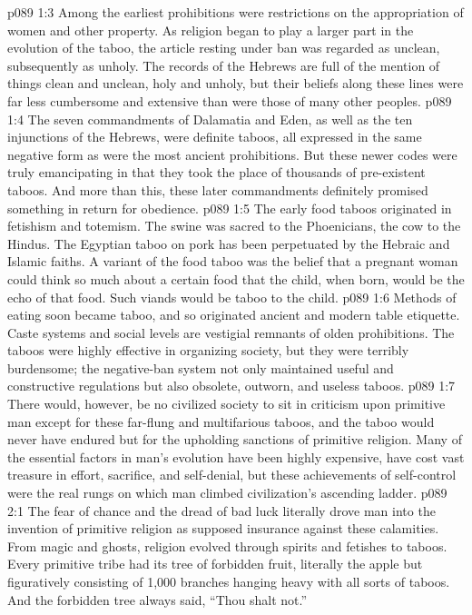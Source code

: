 \vs p089 1:3 Among the earliest prohibitions were restrictions on the appropriation of women and other property. As religion began to play a larger part in the evolution of the taboo, the article resting under ban was regarded as unclean, subsequently as unholy. The records of the Hebrews are full of the mention of things clean and unclean, holy and unholy, but their beliefs along these lines were far less cumbersome and extensive than were those of many other peoples.
\vs p089 1:4 The seven commandments of Dalamatia and Eden, as well as the ten injunctions of the Hebrews, were definite taboos, all expressed in the same negative form as were the most ancient prohibitions. But these newer codes were truly emancipating in that they took the place of thousands of pre\hyp{}existent taboos. And more than this, these later commandments definitely promised something in return for obedience.
\vs p089 1:5 The early food taboos originated in fetishism and totemism. The swine was sacred to the Phoenicians, the cow to the Hindus. The Egyptian taboo on pork has been perpetuated by the Hebraic and Islamic faiths. A variant of the food taboo was the belief that a pregnant woman could think so much about a certain food that the child, when born, would be the echo of that food. Such viands would be taboo to the child.
\vs p089 1:6 Methods of eating soon became taboo, and so originated ancient and modern table etiquette. Caste systems and social levels are vestigial remnants of olden prohibitions. The taboos were highly effective in organizing society, but they were terribly burdensome; the negative\hyp{}ban system not only maintained useful and constructive regulations but also obsolete, outworn, and useless taboos.
\vs p089 1:7 There would, however, be no civilized society to sit in criticism upon primitive man except for these far\hyp{}flung and multifarious taboos, and the taboo would never have endured but for the upholding sanctions of primitive religion. Many of the essential factors in man’s evolution have been highly expensive, have cost vast treasure in effort, sacrifice, and self\hyp{}denial, but these achievements of self\hyp{}control were the real rungs on which man climbed civilization’s ascending ladder.
\vs p089 2:1 The fear of chance and the dread of bad luck literally drove man into the invention of primitive religion as supposed insurance against these calamities. From magic and ghosts, religion evolved through spirits and fetishes to taboos. Every primitive tribe had its tree of forbidden fruit, literally the apple but figuratively consisting of 1,000 branches hanging heavy with all sorts of taboos. And the forbidden tree always said, “Thou shalt not.”
